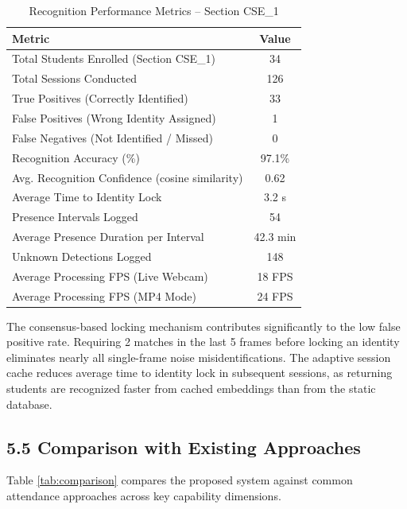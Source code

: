 \documentclass{report}
\begin{document}
\begin{table}[H]
\centering
\begin{tabular}{|l|c|}
\hline
\textbf{Metric} & \textbf{Value} \\
\hline
Total Students Enrolled (Section CSE\_1) & 34 \\
\hline
Total Sessions Conducted & 126 \\
\hline
True Positives (Correctly Identified) & 33 \\
\hline
False Positives (Wrong Identity Assigned) & 1 \\
\hline
False Negatives (Not Identified / Missed) & 0 \\
\hline
Recognition Accuracy (\%) & 97.1\% \\
\hline
Avg. Recognition Confidence (cosine similarity) & 0.62 \\
\hline
Average Time to Identity Lock & 3.2 s \\
\hline
Presence Intervals Logged & 54 \\
\hline
Average Presence Duration per Interval & 42.3 min \\
\hline
Unknown Detections Logged & 148 \\
\hline
Average Processing FPS (Live Webcam) & 18 FPS \\
\hline
Average Processing FPS (MP4 Mode) & 24 FPS \\
\hline
\end{tabular}
\caption{Recognition Performance Metrics -- Section CSE\_1}
\label{tab:metrics}
\end{table}

The consensus-based locking mechanism contributes significantly to the low false positive rate.\vspace{3pt} Requiring 2 matches in the last 5 frames before locking an identity eliminates nearly all single-frame\vspace{3pt} noise misidentifications. The adaptive session cache reduces average time to identity lock in\vspace{3pt} subsequent sessions, as returning students are recognized faster from cached embeddings than\vspace{3pt} from the static database.

\subsection*{5.5 Comparison with Existing Approaches}

Table \ref{tab:comparison} compares the proposed system against common attendance approaches\vspace{3pt} across key capability dimensions.
\end{document}
